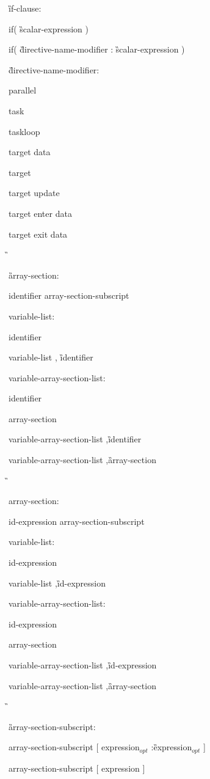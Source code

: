 {\G if-clause:
 
\C\I if( \G scalar-expression \C )

\C\I if( \G directive-name-modifier \C : \G scalar-expression \C )

\G directive-name-modifier:

\C \I parallel

\C \I task

\C \I taskloop

\C \I target data

\C \I target

\C \I target update

\C \I target enter data

\C \I target exit data

\G\cspecificstart
 
\G array-section:

\I identifier array-section-subscript

variable-list:

\I identifier

\I variable-list \C, \G identifier

variable-array-section-list:

\I identifier

\I array-section

\I variable-array-section-list \C ,\G identifier

\I variable-array-section-list \C ,\G array-section

\G\cspecificend

\cppspecificstart

\I array-section:

\I id-expression array-section-subscript

variable-list:

\I id-expression

\I variable-list \C ,\G id-expression

variable-array-section-list:

\I id-expression

\I array-section

\I variable-array-section-list \C ,\G id-expression

\I variable-array-section-list \C ,\G array-section

\G\cppspecificend

\G array-section-subscript:

\I array-section-subscript [ expression$_{opt}$ \C :\G expression$_{opt}$ ]

\I array-section-subscript [ expression ]


\I [ expression ]

} %


